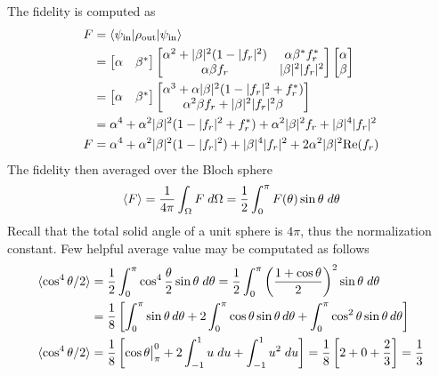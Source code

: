 \documentclass[../../../main.tex]{subfiles}
\begin{document}
The fidelity is computed as
\begin{align*}
  F & =  \braket{\psi_\text{in} | \rho_{\text{out}}|\psi_\text{in} }                                            \\
    & = \begin{bmatrix}
          \alpha & \beta ^*
        \end{bmatrix}
  \begin{bmatrix}
    \alpha^2 + |\beta|^2 (1-|f_r|^2) & \alpha\beta^*  f_r^* \\
    \alpha\beta  f_r                 & |\beta|^2 |f_r|^2
  \end{bmatrix}
  \begin{bmatrix}
    \alpha \\  \beta
  \end{bmatrix}                                                                                               \\
    & = \begin{bmatrix}
          \alpha & \beta ^*
        \end{bmatrix}
  \begin{bmatrix}
    \alpha^3 + \alpha|\beta|^2 (1-|f_r|^2 + f_r ^*) \\
    \alpha^2\beta  f_r + |\beta|^2 |f_r|^2\beta
  \end{bmatrix}                                                               \\
    & =     \alpha^4 + \alpha^2|\beta|^2 (1-|f_r|^2 + f_r ^*) +    \alpha^2|\beta|^2  f_r + |\beta|^4 |f_r|^2   \\
  F & =     \alpha^4 + \alpha^2|\beta|^2 (1-|f_r|^2 ) + |\beta|^4 |f_r|^2 + 2\alpha^2|\beta|^2 \mathrm{Re}(f_r)
\end{align*}
The fidelity then averaged over the Bloch sphere
\begin{align*}
  \braket{F } = \frac{1 }{4\pi} \int_\Omega F \;d\Omega = \frac{1 }{2 } \int_0^\pi F(\theta) \sin \theta\;d\theta
\end{align*}
Recall that the total solid angle of a unit sphere is $4\pi$, thus the normalization constant.
Few helpful average value may be computated as follows
\begin{align*}
  \braket{\cos^4 \theta/2 }
   & = \frac{1 }{2 } \int_{0 }^{\pi} \cos^4 \frac{\theta }{2} \sin \theta\;d\theta
  = \frac{1 }{2 } \int_{0 }^{\pi} \left( \frac{1 +\cos \theta }{2} \right)^2  \sin \theta\;d\theta                                                                       \\
   & = \frac{1}{8}\left[\int_0^\pi \sin\theta\,d\theta + 2\int_0^\pi \cos\theta\sin\theta\,d\theta + \int_0^\pi \cos^2\theta\sin\theta\,d\theta\right]                   \\
  \braket{\cos^4 \theta/2 }
   & = \frac{1}{8} \left[ \cos \theta\big|_\pi^0 +2 \int_{-1 }^{1 }u\;du + \int_{-1 }^{1 }u^2\;du\right]  = \frac{1 }{8 }\left[ 2+0+\frac{2 }{3} \right]  = \frac{1 }{3}
\end{align*}
\end{document}
